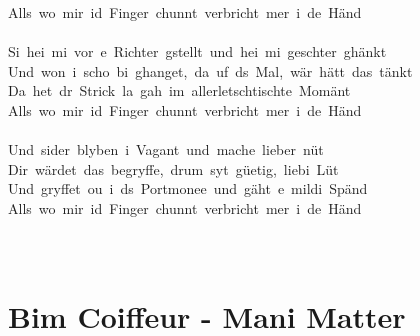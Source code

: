 \documentclass[]{book}
\let\stdsection\section
\renewcommand\section{\clearpage\stdsection}
\begin{document}
Alls~wo~mir~id~Finger~chunnt~verbricht~mer~i~de~Händ\\
~\\
Si~hei~mi~vor~e~Richter~gstellt~und~hei~mi~geschter~ghänkt\\
Und~won~i~scho~bi~ghanget,~da~uf~ds~Mal,~wär~hätt~das~tänkt\\
Da~het~dr~Strick~la~gah~im~allerletschtischte~Momänt\\
Alls~wo~mir~id~Finger~chunnt~verbricht~mer~i~de~Händ\\
~\\
Und~sider~blyben~i~Vagant~und~mache~lieber~nüt\\
Dir~wärdet~das~begryffe,~drum~syt~güetig,~liebi~Lüt\\
Und~gryffet~ou~i~ds~Portmonee~und~gäht~e~mildi~Spänd\\
Alls~wo~mir~id~Finger~chunnt~verbricht~mer~i~de~Händ\\
~\\
~\\

\hypertarget{bim-coiffeur---mani-matter}{%
\section{Bim Coiffeur - Mani Matter}\label{bim-coiffeur---mani-matter}}
\end{document}
